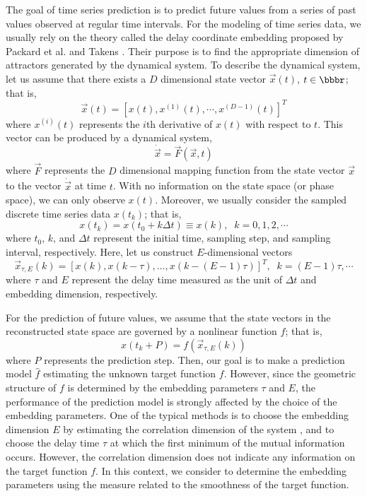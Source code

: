 \documentclass[runningheads,a4paper]{llncs}
\begin{document}
The goal of time series prediction is to predict future values from
a series of past values observed at regular time intervals. For the modeling of time series data, we usually rely
on the theory called the delay coordinate embedding proposed by
Packard et al. \cite{Packard80} and Takens \cite{Takens81}.  Their
purpose is to find the appropriate dimension of attractors generated
by the dynamical system.  To describe the dynamical system, let us
assume that there exists a $D$ dimensional state vector
$\vec{x}(t)$, $t \in \bbbr$; that is,
\begin{equation}
\vec{x}(t) = [x(t), x^{(1)}(t), \cdots, x^{(D-1)}(t)]^T
\end{equation}
where $x^{(i)}(t)$ represents the $i$th derivative of $x(t)$ with
respect to $t$.  This vector can be produced by a dynamical system,
\begin{equation}
\dot{\vec{x}} = \vec{F}(\vec{x}, t)
\end{equation}
where $\vec{F}$ represents the $D$ dimensional mapping function from
the state vector $\vec{x}$ to the vector $\dot{\vec{x}}$ at time
$t$.  With no information on the state space (or phase space), we can only observe
$x(t)$.  Moreover, we usually consider the sampled discrete time
series data $x(t_k)$; that is,
\begin{equation}
x(t_k) = x(t_0 + k\Delta t) \equiv x(k), \; \; k= 0, 1, 2, \cdots
\end{equation}
where $t_0$, $k$, and $\Delta t$ represent the initial time,
sampling step, and sampling interval, respectively.  Here, let us
construct $E$-dimensional vectors
\begin{equation} \label{delayCoordinate}
\vec{x}_{\tau,E}(k) = [x(k), x(k-\tau),\ldots,x(k-(E-1)\tau)]^T, \;
\; k= (E-1)\tau, \cdots
\end{equation}
where $\tau$ and $E$ represent the delay time measured as the unit of $\Delta t$ and embedding
dimension, respectively.

For the prediction of future values, we assume that the state
vectors in the reconstructed state space are governed by a nonlinear
function $f$; that is,
\begin{equation} \label{target:disc}
x(t_k+P) = f(\vec{x}_{\tau,E}(k))
\end{equation}
where $P$ represents the prediction step. Then, our goal is to make a
prediction model $\hat{f}$ estimating the unknown target function
$f$. However, since the geometric structure of $f$ is determined by
the embedding parameters $\tau$ and $E$, the performance of the
prediction model is strongly affected by the choice of the embedding
parameters. One of the typical methods is to choose the embedding
dimension $E$ by estimating the correlation dimension of the system
\cite{Havstad89}, and to choose the delay time $\tau$ at which the
first minimum of the mutual information occurs.
However, the correlation dimension does not indicate any information on the
target function $f$.  In this context, we consider to determine the
embedding parameters using the measure related to the smoothness of
the target function.
\end{document}
